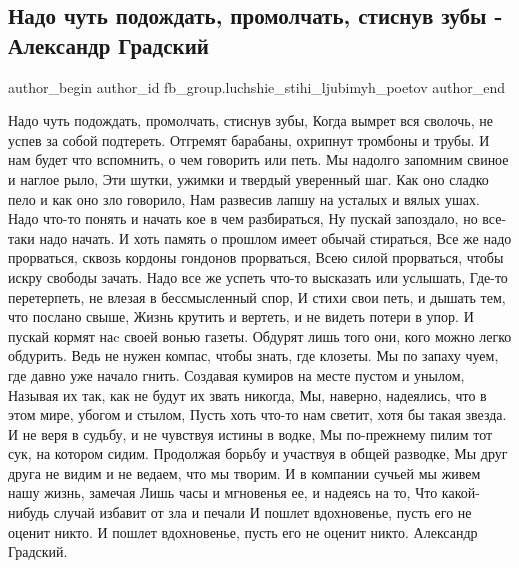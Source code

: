  
 
 
 
 
 
\subsection{Надо чуть подождать, промолчать, стиснув зубы - Александр Градский}
\label{sec:30_11_2021.fb.fb_group.luchshie_stihi_ljubimyh_poetov.1.gradskij_nado_podozhdat}
 
\ifcmt
 author_begin
   author_id fb_group.luchshie_stihi_ljubimyh_poetov
 author_end
\fi

\begin{multicols}{2}
\vspace{0.5cm}
\obeycr\noindent
Надо чуть подождать, промолчать, стиснув зубы,
Когда вымрет вся сволочь, не успев за собой подтереть.
Отгремят барабаны, охрипнут тромбоны и трубы.
И нам будет что вспомнить, о чем говорить или петь.
\smallskip
Мы надолго запомним свиное и наглое рыло,
Эти шутки, ужимки и твердый уверенный шаг.
Как оно сладко пело и как оно зло говорило,
Нам развесив лапшу на усталых и вялых ушах.
\smallskip
Надо что-то понять и начать кое в чем разбираться,
Ну пускай запоздало, но все-таки надо начать.
И хоть память о прошлом имеет обычай стираться,
Все же надо прорваться, сквозь кордоны гондонов прорваться,
Всею силой прорваться, чтобы искру свободы зачать.
\smallskip
Надо все же успеть что-то высказать или услышать,
Где-то перетерпеть, не влезая в бессмысленный спор,
И стихи свои петь, и дышать тем, что послано свыше,
Жизнь крутить и вертеть, и не видеть потери в упор.
И пускай кормят наc своей вонью газеты.
\smallskip
Обдурят лишь того они, кого можно легко обдурить.
Ведь не нужен компас, чтобы знать, где клозеты.
Мы по запаху чуем, где давно уже начало гнить.
\smallskip
Создавая кумиров на месте пустом и унылом,
Называя их так, как не будут их звать никогда,
Мы, наверно, надеялись, что в этом мире, убогом и стылом,
Пусть хоть что-то нам светит, хотя бы такая звезда.
\smallskip
И не веря в судьбу, и не чувствуя истины в водке,
Мы по-прежнему пилим тот сук, на котором сидим.
Продолжая борьбу и участвуя в общей разводке,
Мы друг друга не видим и не ведаем, что мы творим.
\smallskip
И в компании сучьей мы живем нашу жизнь, замечая
Лишь часы и мгновенья ее, и надеясь на то,
Что какой-нибудь случай избавит от зла и печали
И пошлет вдохновенье, пусть его не оценит никто.
И пошлет вдохновенье, пусть его не оценит никто.
\smallskip
Александр Градский.
\restorecr
\end{multicols}
